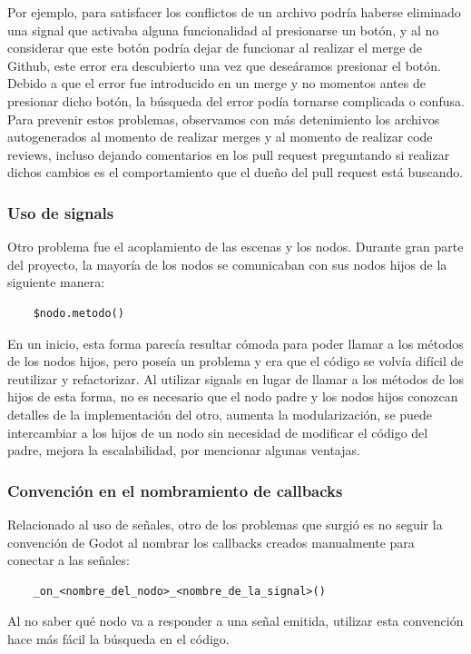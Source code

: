Por ejemplo, para satisfacer los conflictos de un archivo podría haberse eliminado una signal 
que activaba alguna funcionalidad al presionarse un botón, y al no considerar que este botón 
podría dejar de funcionar al realizar el merge de Github, este error era descubierto una 
vez que deseáramos presionar el botón. Debido a que el error fue introducido en un merge y 
no momentos antes de presionar dicho botón, la búsqueda del error podía tornarse complicada 
o confusa. Para prevenir estos problemas, observamos con más detenimiento los archivos 
autogenerados al momento de realizar merges y al momento de realizar code reviews, 
incluso dejando comentarios en los pull request preguntando si realizar dichos cambios 
es el comportamiento que el dueño del pull request está buscando.

\subsubsection{Uso de signals}

Otro problema fue el acoplamiento de las escenas y los nodos. Durante gran parte del proyecto, 
la mayoría de los nodos se comunicaban con sus nodos hijos de la siguiente manera:

\begin{lstlisting}
    $nodo.metodo()
\end{lstlisting}

En un inicio, esta forma parecía resultar cómoda para poder llamar a los métodos de los nodos 
hijos, pero poseía un problema y era que el código se volvía difícil de reutilizar y refactorizar. 
Al utilizar signals en lugar de llamar a los métodos de los hijos de esta forma, no es necesario 
que el nodo padre y los nodos hijos conozcan detalles de la implementación del otro, aumenta 
la modularización, se puede intercambiar a los hijos de un nodo sin necesidad de modificar el 
código del padre, mejora la escalabilidad, por mencionar algunas ventajas.

\subsubsection{Convención en el nombramiento de callbacks}

Relacionado al uso de señales, otro de los problemas que surgió es no seguir la convención de 
Godot al nombrar los callbacks creados manualmente para conectar a las señales:

\begin{lstlisting}
    _on_<nombre_del_nodo>_<nombre_de_la_signal>()
\end{lstlisting}

Al no saber qué nodo va a responder a una señal emitida, utilizar esta convención hace más 
fácil la búsqueda en el código.
